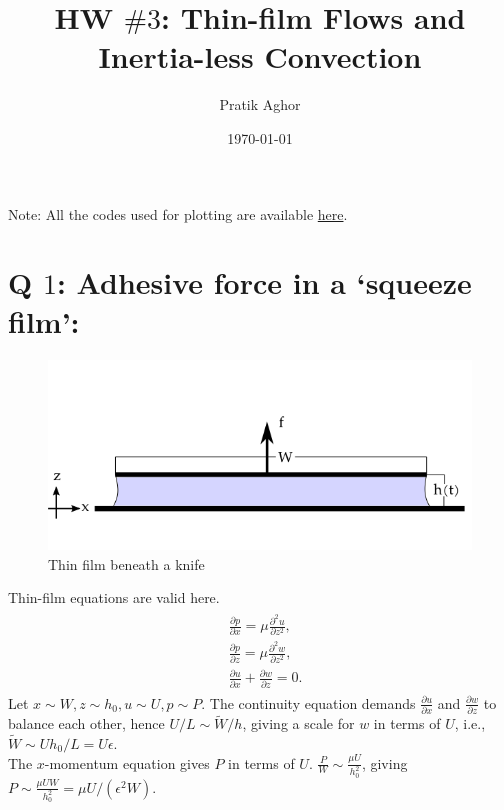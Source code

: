 \documentclass{article}
\author{Pratik Aghor}
\title{HW $\# 3$: Thin-film Flows and Inertia-less Convection}
\date{\today}  %
\begin{document}
\maketitle
Note: All the codes used for plotting are available \href{https://github.com/PratikAghor/lec_notes/tree/master/fluid_dynamics/hw3_fluid_dyn_PratikAgor/codes                                  
}{here}.
\section{Q $1$: Adhesive force in a ‘squeeze film’:}
\begin{figure}[H]
    \centering
    \includegraphics[scale = 0.5]{Figs/thin_film_knife.png}
    \caption{Thin film beneath a knife}
    \label{fig:thin_film_knife}
\end{figure}

Thin-film equations are valid here.
\begin{align}\label{eq:thin_film_dim}
 \begin{split}
  & \frac{\partial p}{\partial x} = \mu\frac{\partial^{2}u}{\partial z^{2}},\\
  & \frac{\partial p}{\partial z} = \mu\frac{\partial^{2}w}{\partial z^{2}},\\
  & \frac{\partial u}{\partial x} + \frac{\partial w}{\partial z} = 0.
 \end{split}
\end{align}
Let $x\sim W, z \sim h_{0}, u \sim U, p \sim P$. The continuity equation demands $\frac{\partial u}{\partial x}$ and $\frac{\partial w}{\partial z}$ to balance each other, hence $U/L \sim \tilde{W}/h$, giving a scale for $w$ in terms of $U$, i.e., $\tilde{W} \sim Uh_{0}/L = U\epsilon$.\\
The $x$-momentum equation gives $P$ in terms of $U$. 
$\frac{P}{W} \sim \frac{\mu U}{h_{0}^{2}}$, giving $P \sim \frac{\mu U W}{h_{0}^{2}} = \mu U/(\epsilon^{2}W)$.
\end{document}
